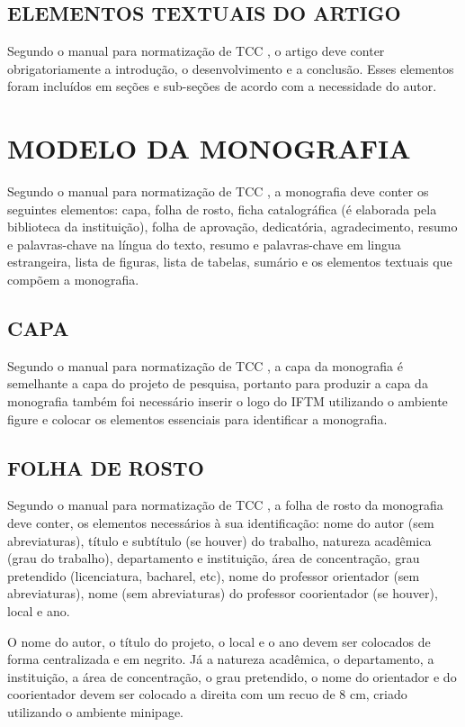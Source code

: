 \subsection{ELEMENTOS TEXTUAIS DO ARTIGO}
Segundo o manual para normatização de TCC \cite{manualTCC}, o artigo deve conter obrigatoriamente a introdução, o desenvolvimento e a conclusão. Esses elementos foram incluídos em seções e sub-seções de acordo com a necessidade do autor.

\newpage
\section{MODELO DA MONOGRAFIA}
\indent Segundo o manual para normatização de TCC \cite{manualTCC}, a monografia deve conter os seguintes elementos: capa,  folha de rosto, ficha catalográfica (é elaborada pela biblioteca da instituição), folha de aprovação, dedicatória, agradecimento, resumo e palavras-chave na língua do texto, resumo e palavras-chave em lingua estrangeira, lista de figuras, lista de tabelas, sumário e os elementos textuais que compõem a monografia.

\subsection{CAPA}
Segundo o manual para normatização de TCC \cite{manualTCC}, a capa da monografia é semelhante a capa do projeto de pesquisa, portanto para produzir a capa da monografia também foi necessário inserir o logo do IFTM utilizando o ambiente figure e colocar os elementos essenciais para identificar a monografia.

\subsection{FOLHA DE ROSTO}
Segundo o manual para normatização de TCC \cite{manualTCC}, a folha de rosto da monografia deve conter, os elementos necessários à sua identificação: nome do autor (sem abreviaturas), título e subtítulo (se houver) do trabalho, natureza acadêmica (grau do trabalho), departamento e instituição, área de concentração, grau pretendido (licenciatura, bacharel, etc), nome do professor orientador (sem abreviaturas), nome (sem abreviaturas) do professor coorientador (se houver), local e ano.

O nome do autor, o título do projeto, o local e o ano devem ser colocados de forma centralizada e em negrito. Já a natureza acadêmica, o departamento, a instituição, a área de concentração, o grau pretendido, o nome do orientador e do coorientador devem ser colocado a direita com um recuo de 8 cm, criado utilizando o ambiente minipage.

